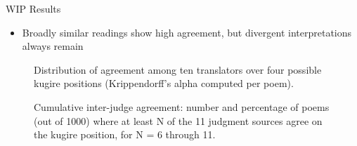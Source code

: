 \begin{block}{WIP Results}
\begin{itemize}
\item Broadly similar readings show high agreement, but divergent interpretations always remain
\end{itemize}

\vspace{1.0ex}

\begin{figure}[H]\centering

\setcounter{figure}{7}
\caption{Distribution of agreement among ten translators over four possible
kugire positions (Krippendorff's alpha computed per poem).}
\end{figure}

\vspace{1.0ex}

\begin{figure}[H]\centering

\setcounter{figure}{8}
\caption{Cumulative inter-judge agreement: number and percentage of poems (out
of 1000) where at least N of the 11 judgment sources agree on the kugire
position, for N = 6 through 11.}
\end{figure}
\end{block}
